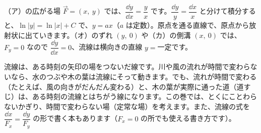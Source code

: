 \noindent （ア）の広がる場 $\vec F=(x,\ y)$ では、$\dfrac{\dd y}{\dd x}=\dfrac{y}{x}$ です。$\dfrac{\dd y}{y}=\dfrac{\dd x}{x}$ と分けて積分すると、$\ln|y|=\ln|x|+C$ で、$y=ax$（$a$ は定数）。原点を通る直線で、原点から放射状に出ていきます。（オ）のずれ $(y,\ 0)$ や（カ）の側溝 $(x,\ 0)$ では、$F_y=0$ なので $\dfrac{\dd y}{\dd x}=0$、流線は横向きの直線 $y=$一定です。
\begin{seikaku}
流線は、ある時刻の矢印の場をつないだ線です。川や風の流れが時間で変わらないなら、水のつぶや木の葉は流線にそって動きます。でも、流れが時間で変わる（たとえば、風の向きがだんだん変わる）と、木の葉が実際に通った道（道すじ）は、ある時刻の流線とはちがう線になります。この巻では、とくにことわらないかぎり、時間で変わらない場（定常な場）を考えます。また、流線の式を $\dfrac{\dd x}{F_x}=\dfrac{\dd y}{F_y}$ の形で書く本もあります（$F_x=0$ の所でも使える書き方です）。
\end{seikaku}


